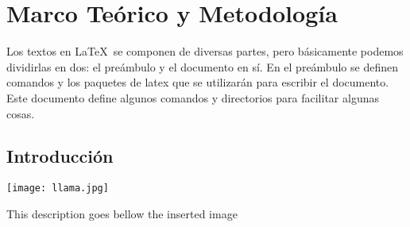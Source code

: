 
\chapter{Marco Teórico y Metodología}
\label{chap:MarcoTeorico}
Los textos en \index{\LaTeX}\LaTeX~se componen de diversas partes, pero básicamente podemos dividirlas en dos: el preámbulo y el documento en sí. En el preámbulo se definen comandos y los paquetes de latex que se utilizarán para escribir el documento. Este documento define algunos comandos y directorios para facilitar algunas cosas.

\section{Introducción}
\label{sec:introduction}

\begin{figuraenv}
\texttt{[image: llama.jpg]}
\caption[This label goes to the TOC]{This description goes bellow the inserted image}\label{label to reference the image into text}
\end{figuraenv}

